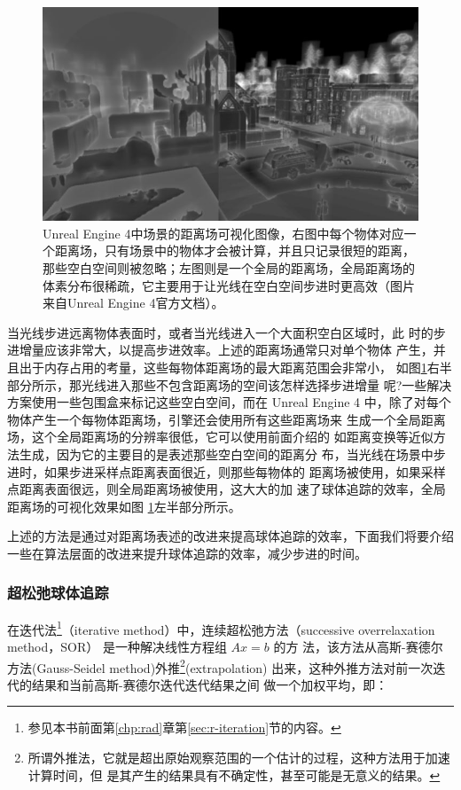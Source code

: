 \begin{figure}
	\includegraphics[width=\textwidth]{figures/df/DF_GlobalDF}
	\caption{Unreal Engine 4中场景的距离场可视化图像，右图中每个物体对应一个距离场，只有场景中的物体才会被计算，并且只记录很短的距离，那些空白空间则被忽略；左图则是一个全局的距离场，全局距离场的体素分布很稀疏，它主要用于让光线在空白空间步进时更高效（图片来自Unreal Engine 4官方文档）。}
	\label{f:df-DF_GlobalDF}
\end{figure}

当光线步进远离物体表面时，或者当光线进入一个大面积空白区域时，此 时的步进增量应该非常大，以提高步进效率。上述的距离场通常只对单个物体 产生，并且出于内存占用的考量，这些每物体距离场的最大距离范围会非常小， 如图\ref{f:df-DF_GlobalDF}右半部分所示，那光线进入那些不包含距离场的空间该怎样选择步进增量 呢?一些解决方案使用一些包围盒来标记这些空白空间，而在 Unreal Engine 4 中，除了对每个物体产生一个每物体距离场，引擎还会使用所有这些距离场来 生成一个全局距离场，这个全局距离场的分辨率很低，它可以使用前面介绍的 如距离变换等近似方法生成，因为它的主要目的是表述那些空白空间的距离分 布，当光线在场景中步进时，如果步进采样点距离表面很近，则那些每物体的 距离场被使用，如果采样点距离表面很远，则全局距离场被使用，这大大的加 速了球体追踪的效率，全局距离场的可视化效果如图 \ref{f:df-DF_GlobalDF}左半部分所示。

上述的方法是通过对距离场表述的改进来提高球体追踪的效率，下面我们将要介绍一些在算法层面的改进来提升球体追踪的效率，减少步进的时间。



\subsubsection{超松弛球体追踪}
在迭代法\footnote{参见本书前面第\ref{chp:rad}章第\ref{sec:r-iteration}节的内容。}（iterative method）中，连续超松弛方法（successive overrelaxation method，SOR）\cite{a:Successiveoverrelaxationmethod}  是一种解决线性方程组 $Ax = b$ 的方 法，该方法从高斯-赛德尔方法(Gauss-Seidel method)外推\footnote{所谓外推法，它就是超出原始观察范围的一个估计的过程，这种方法用于加速计算时间，但 是其产生的结果具有不确定性，甚至可能是无意义的结果。}(extrapolation) 出来，这种外推方法对前一次迭代的结果和当前高斯-赛德尔迭代迭代结果之间 做一个加权平均，即：

